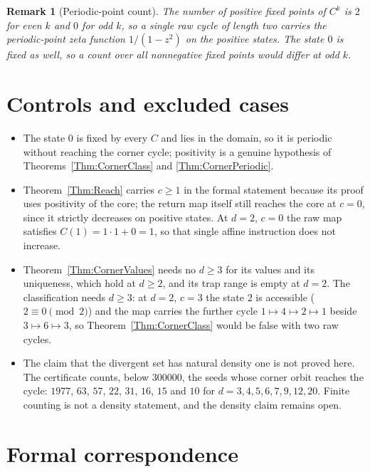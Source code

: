 \documentclass[11pt,letterpaper]{article}
\newtheorem{remark}[theorem]{Remark}
\begin{document}
\begin{remark}[Periodic-point count]\label{Rem:CornerCount}
The number of positive fixed points of \(C^{k}\) is \(2\) for even \(k\) and
\(0\) for odd \(k\), so a single raw cycle of length two carries the
periodic-point zeta function \(1/(1-z^{2})\) on the positive states. The state
\(0\) is fixed as well, so a count over all nonnegative fixed points would
differ at odd \(k\).
\end{remark}

\section{Controls and excluded cases}

\begin{itemize}[leftmargin=2em]
\item The state \(0\) is fixed by every \(C\) and lies in the domain, so it is
periodic without reaching the corner cycle; positivity is a genuine
hypothesis of Theorems~\ref{Thm:CornerClass} and \ref{Thm:CornerPeriodic}.
\item Theorem~\ref{Thm:Reach} carries \(c\ge1\) in the formal statement because
its proof uses positivity of the core; the return map itself still reaches the
core at \(c=0\), since it strictly decreases on positive states. At \(d=2\),
\(c=0\) the raw map satisfies \(C(1)=1\cdot1+0=1\), so that single affine
instruction does not increase.
\item Theorem~\ref{Thm:CornerValues} needs no \(d\ge3\) for its values and its
uniqueness, which hold at \(d\ge2\), and its trap range is empty at \(d=2\).
The classification needs \(d\ge3\): at \(d=2\), \(c=3\) the state \(2\) is
accessible (\(2\equiv0\pmod2\)) and the map carries the further cycle
\(1\mapsto4\mapsto2\mapsto1\) beside \(3\mapsto6\mapsto3\), so
Theorem~\ref{Thm:CornerClass} would be false with two raw cycles.
\item The claim that the divergent set has natural density one is not proved
here. The certificate counts, below \(300000\), the seeds whose corner orbit
reaches the cycle: \(1977\), \(63\), \(57\), \(22\), \(31\), \(16\), \(15\) and
\(10\) for \(d=3,4,5,6,7,9,12,20\). Finite counting is not a density
statement, and the density claim remains open.
\end{itemize}

\section{Formal correspondence}
\end{document}
